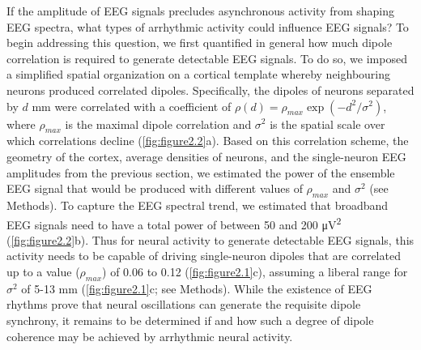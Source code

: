 If the amplitude of EEG signals precludes asynchronous activity from shaping EEG spectra, what types of arrhythmic activity could influence EEG signals? To begin addressing this question, we first quantified in general how much dipole correlation is required to generate detectable EEG signals. To do so, we imposed a simplified spatial organization on a cortical template whereby neighbouring neurons produced correlated dipoles. Specifically, the dipoles of neurons separated by $d$ \unit{\milli\meter} were correlated with a coefficient of $\rho(d)=\rho_{max}\exp{(-d^2/\sigma^2)}$, where $\rho_{max}$ is the maximal dipole correlation and $\sigma^2$ is the spatial scale over which correlations decline (\autoref{fig:figure2.2}a). Based on this correlation scheme, the geometry of the cortex, average densities of neurons, and the single-neuron EEG amplitudes from the previous section, we estimated the power of the ensemble EEG signal that would be produced with different values of $\rho_{max}$ and $\sigma^2$ (see Methods). To capture the EEG spectral trend, we estimated that broadband EEG signals need to have a total power of between 50 and 200 \unit{\micro\volt\squared} (\autoref{fig:figure2.2}b). Thus for neural activity to generate detectable EEG signals, this activity needs to be capable of driving single-neuron dipoles that are correlated up to a value ($\rho_{max}$) of 0.06 to 0.12 (\autoref{fig:figure2.1}c), assuming a liberal range for $\sigma^2$ of 5-13 \unit{\milli\meter} (\autoref{fig:figure2.1}c; see Methods). While the existence of EEG rhythms prove that neural oscillations can generate the requisite dipole synchrony, it remains to be determined if and how such a degree of dipole coherence may be achieved by arrhythmic neural activity. 



